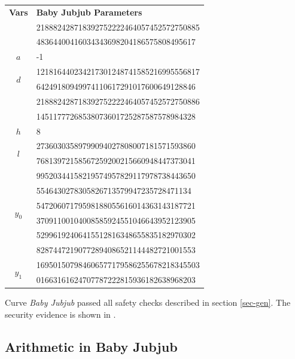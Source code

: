 \documentclass{article}
\theoremstyle{definition}
\theoremstyle{remark}
\begin{document}
\begin{spacing}{1.2}
\begin{multicols}{2}
\begin{center}
\begin{tabular}{|c|l|}
	\hline
		{\bf Vars} & {\bf \qquad\quad Baby Jubjub Parameters}\\
	\Xhline{3\arrayrulewidth}			
		\multirow{2}{*}{$p$} 	& 218882428718392752222464057452572750885\\ 
								& 48364400416034343698204186575808495617 \\
	\Xhline{3\arrayrulewidth}			
		{$a$} 	& -1 \\ 
	\hline
		\multirow{2}{*}{$d$} 	& 121816440234217301248741585216995556817 \\
								& 64249180949974110617291017600649128846 \\
	\Xhline{3\arrayrulewidth}			
		\multirow{2}{*}{$n$} 	& 218882428718392752222464057452572750886 \\
								& 14511777268538073601725287587578984328 \\ 
	\hline
		{$h$} 	& 8 \\
	\hline
		\multirow{2}{*}{$l$} 	& 27360303589799094027808007181571593860 \\
								& 76813972158567259200215660948447373041 \\
	\Xhline{3\arrayrulewidth}			
		\multirow{2}{*}{$x_0$} 	& 99520344158219574957829117978738443650 \\
								& 5546430278305826713579947235728471134 \\ 
	\hline
		\multirow{2}{*}{$y_0$} 	& 54720607179598188055616014363143187721 \\
								& 37091100104008585924551046643952123905 \\
	\Xhline{3\arrayrulewidth}			
		\multirow{2}{*}{$x_1$} 	& 52996192406415512816348655835182970302 \\
								& 82874472190772894086521144482721001553 \\ 
	\hline
		\multirow{2}{*}{$y_1$}	& 169501507984606577179586255678218345503 \\
								& 01663161624707787222815936182638968203 \\ 
	\hline
\end{tabular}
\end{center}

Curve {\it Baby Jubjub} passed all safety checks described in section \ref{sec-gen}. The security evidence is shown in \cite{github:barry:babyjubjub}.

\subsection{Arithmetic in Baby Jubjub}


\end{multicols}
\end{spacing}
\end{document}
